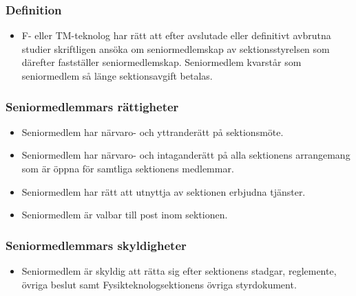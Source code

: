 \documentclass[11pt,a4paper]{article}
\begin{document}
\subsubsection{Definition}

\begin{itemize}

  \item F- eller TM-teknolog har rätt att efter avslutade eller definitivt
  avbrutna studier skriftligen ansöka om seniormedlemskap av sektionsstyrelsen
  som därefter fastställer seniormedlemskap. Seniormedlem kvarstår som
  senior\-med\-lem så länge sektionsavgift betalas.

\end{itemize}

\subsubsection{Seniormedlemmars rättigheter}

\begin{itemize}

   \item Seniormedlem har närvaro- och yttranderätt på sektionsmöte.

   \item Seniormedlem har närvaro- och intaganderätt på alla
   sektionens arrangemang som är öppna för samtliga sektionens
   medlemmar.

   \item Seniormedlem har rätt att utnyttja av sektionen erbjudna
   tjänster.
   
   \item Seniormedlem är valbar till post inom sektionen.

\end{itemize}

\subsubsection{Seniormedlemmars skyldigheter}

\begin{itemize}


\item Seniormedlem är skyldig att rätta sig efter sektionens stadgar,
   regle\-mente, övriga beslut samt  Fysikteknologsektionens övriga styrdokument.
\end{itemize}
\end{document}
